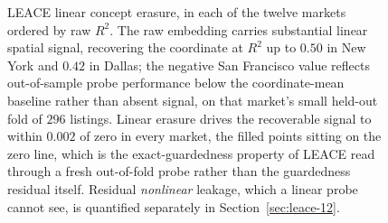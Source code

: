 \begin{figure}[H]
{LEACE linear concept erasure, in each of the twelve markets ordered by raw $R^2$.
The raw embedding carries substantial linear spatial signal, recovering the
coordinate at $R^2$ up to $0.50$ in New York and $0.42$ in Dallas; the negative San
Francisco value reflects out-of-sample probe performance below the coordinate-mean
baseline rather than absent signal, on that market's small held-out fold of $296$
listings. Linear erasure drives the recoverable signal to within $0.002$ of zero in
every market, the filled points sitting on the zero line, which is the
exact-guardedness property of LEACE read through a fresh out-of-fold probe rather
than the guardedness residual itself. Residual \emph{nonlinear} leakage, which a
linear probe cannot see, is quantified separately in Section~\ref{sec:leace-12}.}
\label{fig:erasure-12}
\end{figure}

